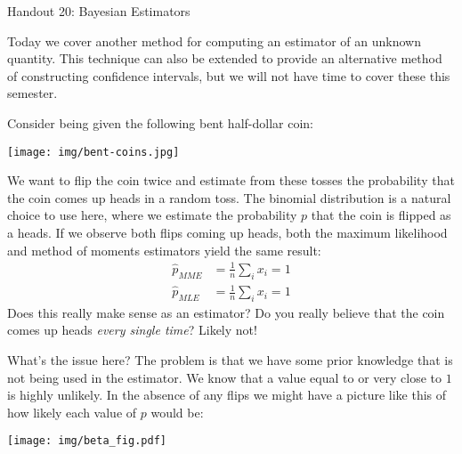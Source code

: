 \documentclass{tufte-handout}
\begin{document}
\justify

{\LARGE Handout 20: Bayesian Estimators}

\vspace*{18pt}

\noindent

Today we cover another method for computing an estimator of an
unknown quantity. This technique can also be extended to provide
an alternative method of constructing confidence intervals, but
we will not have time to cover these this semester.

Consider being given the following bent half-dollar coin:

\begin{center}
\texttt{[image: img/bent-coins.jpg]}
\end{center}

We want to flip the coin twice and estimate from these tosses the
probability that the coin comes up heads in a random toss. The
binomial distribution is a natural choice to use here, where we
estimate the probability $p$ that the coin is flipped as a heads.
If we observe both flips coming up heads, both the maximum likelihood
and method of moments estimators yield the same result:
\begin{align*}
\widehat{p}_{MME} &= \frac{1}{n} \sum_i x_i = 1 \\
\widehat{p}_{MLE} &= \frac{1}{n} \sum_i x_i = 1
\end{align*}
Does this really make sense as an estimator? Do you really believe
that the coin comes up heads \textit{every single time}? Likely not!

What's the issue here? The problem is that we have some prior knowledge
that is not being used in the estimator. We know that a value equal to
or very close to $1$ is highly unlikely. In the absence of any flips
we might have a picture like this of how likely each value of $p$
would be:

\texttt{[image: img/beta\_fig.pdf]}
\end{document}
